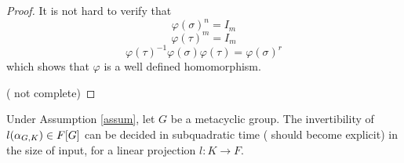 \begin{proof}
It is not hard to verify that 
$$\varphi(\sigma)^n = I_m$$
$$\varphi(\tau)^m = I_m$$
$$\varphi(\tau)^{-1}\varphi(\sigma) \varphi(\tau) = \varphi(\sigma)^r$$
which shows that $\varphi$ is a well defined homomorphism.



({\color{red} not complete})
\end{proof}

\begin{proposition}
Under Assumption \ref{assum}, let $G$ be a metacyclic group. The invertibility of $l(\alpha_{G,K}) \in F[G]$ can be decided in 
subquadratic time ({\color{red} should become explicit}) in the size of input, for a linear projection $l: K\rightarrow F$.
\end{proposition}



